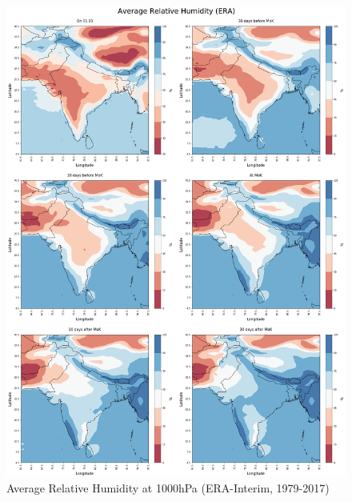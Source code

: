 \begin{figure}[h]
  \centering
  \includegraphics[width=\linewidth]{./99_appendix/img/r_avg}
  \caption{Average Relative Humidity at 1000hPa (ERA-Interim, 1979-2017)}
  \label{apx:era_r}
\end{figure}

